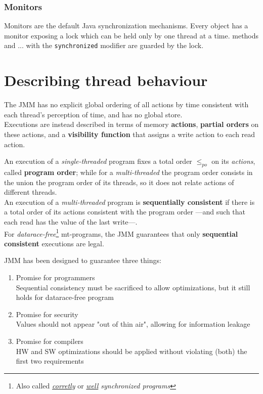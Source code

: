 \subsubsection{Monitors}
Monitors are the default Java synchronization mechanisms.
Every object has a monitor exposing a lock which can be held only by one thread at a time.
methods and ... with the \lstinline|synchronized| modifier are guarded by the lock.

\section{Describing thread behaviour}
\label{sec:behaviour_actions}
The JMM has no explicit global ordering of all actions by time consistent with each thread's perception of time, and has no global store.\\
Executions are instead described in terms of memory \textbf{actions},
\textbf{partial orders} on these actions, and a \textbf{visibility function} that assigns a write action to each read action.

\nl

An execution of a \textit{single-threaded} program fixes a total order $\leq_{po}$ on its \textit{actions}, called \textbf{program order};
while for a \textit{multi-threaded} the program order consists in the union the program order of its threads,
so it does not relate actions of different threads.\\
An execution of a \textit{multi-threaded} program is \textbf{sequentially consistent} if there is a total order of its actions consistent with the program order {---}and such that each read has the value of the last write{---}.\\
For \textit{datarace-free}\footnote{Also called \textit{\underline{corretly}} or \textit{\underline{well} synchronized programs}} mt-programs, the JMM guarantees that only \textbf{sequential consistent} executions are legal.

JMM has been designed to guarantee three things:
\begin{enumerate}
   \item Promise for programmers\\
   Sequential consistency must be sacrificed to allow optimizations, 
   but it still holds for datarace-free program
   \item Promise for security\\
   Values should not appear "out of thin air", allowing for information leakage
   \item Promise for compilers\\
   HW and SW optimizations should be applied without violating (both) the first two requirements
\end{enumerate}

